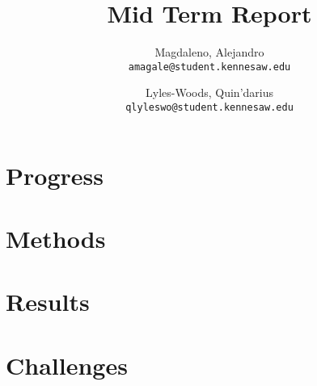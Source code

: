 \documentclass{report}
\title{Mid Term Report}
\author{
	Magdaleno, Alejandro\\
	\texttt{amagale@student.kennesaw.edu}
	\and
	Lyles-Woods, Quin'darius \\
	\texttt{qlyleswo@student.kennesaw.edu}
}
\begin{document}
\maketitle
\section*{Progress}

\section*{Methods}

\section*{Results}

\section*{Challenges}

\end{document}
